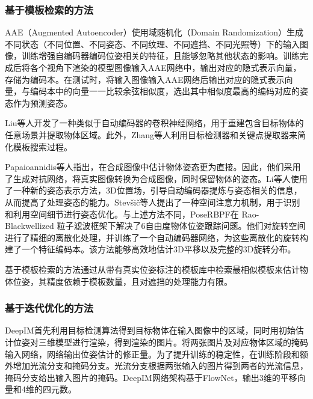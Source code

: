 \subsubsection{基于模板检索的方法}\label{基于模板检索的方法}

\par AAE（Augmented Autoencoder）\cite{sundermeyer2018implicit}使用域随机化（Domain Randomization）生成不同状态（不同位置、不同姿态、不同纹理、不同遮挡、不同光照等）下的输入图像，训练增强自编码器编码位姿相关的特征，且能够忽略其他状态的影响。训练完成后将各个视角下渲染的模型图像输入AAE网络中，输出对应的隐式表示向量，存储为编码本。在测试时，将输入图像输入AAE网络后输出对应的隐式表示向量，与编码本中的向量一一比较余弦相似度，选出其中相似度最高的编码对应的姿态作为预测姿态。

\par Liu等人\cite{Liu2019cutout}开发了一种类似于自动编码器的卷积神经网络，用于重建包含目标物体的任意场景并提取物体区域。此外，Zhang等人\cite{Zhang2020preprocessing}利用目标检测器和关键点提取器来简化模板搜索过程。

\par Papaioannidis等人\cite{9206072}指出，在合成图像中估计物体姿态更为直接。因此，他们采用了生成对抗网络，将真实图像转换为合成图像，同时保留物体的姿态。Li等人\cite{Li2020Pose}使用了一种新的姿态表示方法，3D位置场，引导自动编码器提炼与姿态相关的信息，从而提高了处理姿态的能力。Stev\v{s}i\v{c}等人\cite{Stev2020Spatial}提出了一种空间注意力机制，用于识别和利用空间细节进行姿态优化。与上述方法不同，PoseRBPF\cite{Deng2021PoseRBPF}在 Rao-Blackwellized 粒子滤波框架\cite{Murphy2001}下解决了6自由度物体位姿跟踪问题。他们对旋转空间进行了精细的离散化处理，并训练了一个自动编码器网络，为这些离散化的旋转构建了一个特征编码本。该方法能够高效地估计3D平移以及完整的3D旋转分布。

\par 基于模板检索的方法通过从带有真实位姿标注的模板库中检索最相似模板来估计物体位姿，其精度依赖于模板数量，且对遮挡的处理能力有限。

\subsubsection{基于迭代优化的方法}\label{基于迭代优化的方法}

DeepIM\cite{li2018deepim}首先利用目标检测算法得到目标物体在输入图像中的区域，同时用初始估计位姿对三维模型进行渲染，得到渲染的图片。将两张图片及对应物体区域的掩码输入网络，网络输出位姿估计的修正量。为了提升训练的稳定性，在训练阶段和额外增加光流分支和掩码分支。光流分支根据两张输入的图片得到两者的光流信息，掩码分支给出输入图片的掩码。DeepIM网络架构基于FlowNet\cite{dosovitskiy2015flownet}，输出3维的平移向量和4维的四元数。

